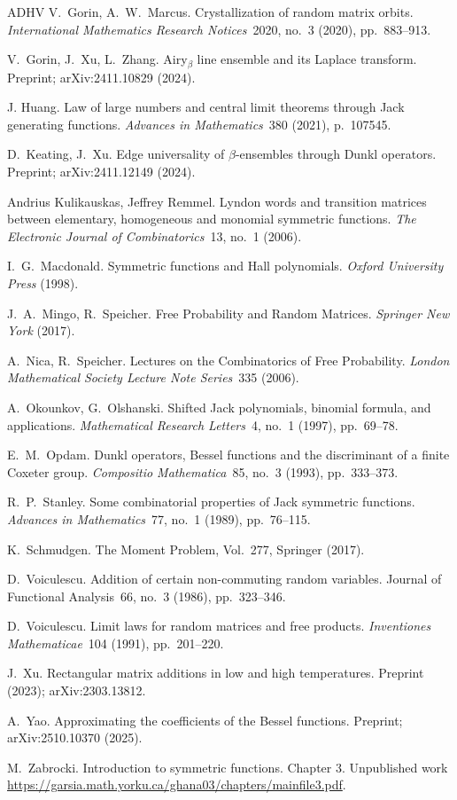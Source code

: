 \documentclass[11pt]{article}
\theoremstyle{plain}
\begin{document}
\begin{thebibliography}{ADHV}
V.~Gorin, A.~W.~Marcus. Crystallization of random matrix orbits. \emph{International Mathematics Research Notices}~2020, no.~3 (2020), pp.~883--913.

V.~Gorin, J.~Xu, L.~Zhang. Airy$_\beta$ line ensemble and its Laplace transform. Preprint; arXiv:2411.10829 (2024).

 J. Huang. Law of large numbers and central limit theorems through Jack generating functions.
\emph{Advances in Mathematics}~380 (2021), p.~107545.

D.~Keating, J.~Xu. Edge universality of $\beta$-ensembles through Dunkl operators. Preprint; arXiv:2411.12149 (2024).

Andrius Kulikauskas, Jeffrey Remmel. Lyndon words and transition matrices between elementary, homogeneous and monomial symmetric functions. \emph{The Electronic Journal of Combinatorics}~13, no.~1 (2006).

I.~G.~Macdonald. Symmetric functions and Hall polynomials. \emph{Oxford University Press} (1998).

J.~A.~Mingo, R.~Speicher. Free Probability and Random Matrices. \emph{Springer New York} (2017).

A.~Nica, R.~Speicher. Lectures on the Combinatorics of Free Probability. \emph{London Mathematical
Society Lecture Note Series}~335 (2006).

A.~Okounkov, G.~Olshanski. Shifted Jack polynomials, binomial formula, and applications. \emph{Mathematical Research Letters}~4, no.~1 (1997), pp.~69--78.

E.~M.~Opdam. Dunkl operators, Bessel functions and the discriminant of a finite Coxeter group. \emph{Compositio Mathematica}~85, no.~3 (1993), pp.~333--373.

R.~P.~Stanley. Some combinatorial properties of Jack symmetric functions. \emph{Advances in Mathematics}~77, no.~1 (1989), pp.~76--115.

K.~Schmudgen. The Moment Problem, Vol.~277, Springer (2017).

D.~Voiculescu. Addition of certain non-commuting random variables. Journal of Functional Analysis~66, no.~3 (1986), pp.~323--346.
 
D.~Voiculescu. Limit laws for random matrices and free products. \emph{Inventiones Mathematicae}~104 (1991), pp.~201--220.

J.~Xu. Rectangular matrix additions in low and high temperatures. Preprint (2023); arXiv:2303.13812.

A.~Yao. Approximating the coefficients of the Bessel functions. Preprint; arXiv:2510.10370 (2025).

M.~Zabrocki. Introduction to symmetric functions. Chapter 3. Unpublished work \url{https://garsia.math.yorku.ca/ghana03/chapters/mainfile3.pdf}.

\end{thebibliography}
\end{document}
